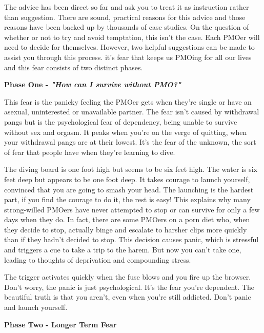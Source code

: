 \documentclass[easypeasy.tex]{subfiles}
\begin{document}
The advice has been direct so far and ask you to treat it as instruction rather than suggestion. There are sound, practical reasons for this advice and those reasons have been backed up by thousands of case studies. On the question of whether or not to try and avoid temptation, this isn't the case. Each PMOer will need to decide for themselves. However, two helpful suggestions can be made to assist you through this process. it's fear that keeps us PMOing for all our lives and this fear consists of two distinct phases.

\textbf{Phase One - \textit{"How can I survive without PMO?"}}

This fear is the panicky feeling the PMOer gets when they're single or have an asexual, uninterested or unavailable partner. The fear isn't caused by withdrawal pangs but is the psychological fear of dependency, being unable to survive without sex and orgasm. It peaks when you're on the verge of quitting, when your withdrawal pangs are at their lowest. It's the fear of the unknown, the sort of fear that people have when they're learning to dive.

The diving board is one foot high but seems to be six feet high. The water is six feet deep but appears to be one foot deep. It takes courage to launch yourself, convinced that you are going to smash your head. The launching is the hardest part, if you find the courage to do it, the rest is easy! This explains why many strong-willed PMOers have never attempted to stop or can survive for only a few days when they do. In fact, there are some PMOers on a porn diet who, when they decide to stop, actually binge and escalate to harsher clips more quickly than if they hadn't decided to stop. This decision causes panic, which is stressful and triggers a cue to take a trip to the harem. But now you can't take one, leading to thoughts of deprivation and compounding stress.

The trigger activates quickly when the fuse blows and you fire up the browser. Don't worry, the panic is just psychological. It's the fear you're dependent. The beautiful truth is that you aren't, even when you're still addicted. Don't panic and launch yourself.

\textbf{Phase Two - Longer Term Fear}
\end{document}
